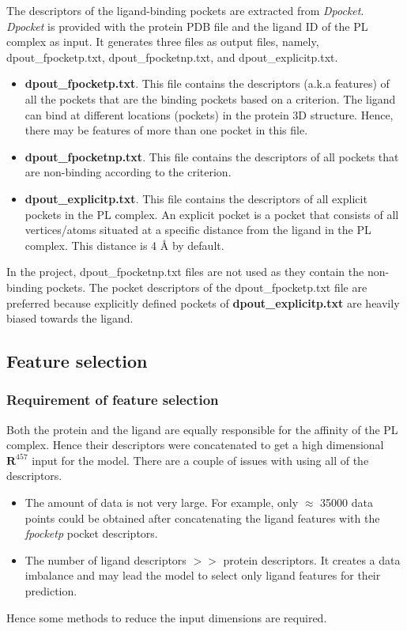 \documentclass[11pt]{article}
\begin{document}
The descriptors of the ligand-binding pockets are extracted from \textit{Dpocket}.
\textit{Dpocket} is provided with the protein PDB file and the ligand ID of the PL complex as input.
It generates three files as output files,  namely,  dpout\_fpocketp.txt, dpout\_fpocketnp.txt,  and  dpout\_explicitp.txt.
\begin{itemize}
\item \textbf{dpout\_fpocketp.txt}.
This file contains the descriptors (a.k.a features) of all the pockets that are the binding pockets based on a criterion.
The ligand can bind at different locations (pockets) in the protein 3D structure.
Hence,  there may be features of more than one pocket in this file.
\item \textbf{dpout\_fpocketnp.txt}.  This file contains the descriptors of all pockets that are non-binding according to the criterion.
\item \textbf{dpout\_explicitp.txt}.  This file contains the descriptors of all explicit pockets in the PL complex. An explicit pocket is a pocket that consists of all vertices/atoms situated at a specific distance from the ligand in the PL complex.
This distance is 4 \r{A} by default. 
\end{itemize}

In the project,  dpout\_fpocketnp.txt files are not used as they contain the non-binding pockets.
The pocket descriptors of the dpout\_fpocketp.txt file are preferred because explicitly defined pockets of \textbf{dpout\_explicitp.txt} are heavily biased towards the ligand.

\subsection{Feature selection}
\subsubsection{Requirement of feature selection}
Both the protein and the ligand are equally responsible for the affinity of the PL complex.
Hence their descriptors were concatenated to get a high dimensional $\mathbf{R}^{457}$ input for the model.
There are a couple of issues with using all of the descriptors.
\begin{itemize}
\item The amount of data is not very large. 
For example,  only $\approx$ 35000 data points could be obtained after concatenating the ligand features with the \textit{fpocketp} pocket descriptors.
\item The number of ligand descriptors $>>$ protein descriptors.
It creates a data imbalance and may lead the model to select only ligand features for their prediction.
\end{itemize}
Hence some methods to reduce the input dimensions are required.
\end{document}

